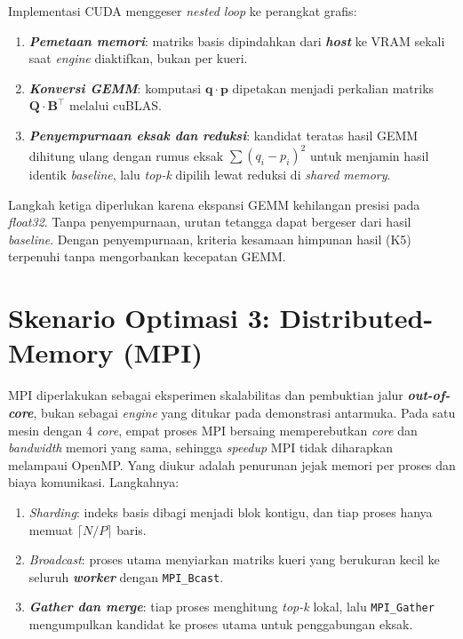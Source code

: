 \documentclass[12pt,a4paper,oneside]{report}
\newcommand{\keyword}[1]{\textbf{\textit{#1}}}
\newcommand{\vect}[1]{\mathbf{#1}}
\begin{document}
Implementasi CUDA menggeser \textit{nested loop} ke perangkat grafis:
\begin{enumerate}[leftmargin=2em]
  \item \keyword{Pemetaan memori}: matriks basis dipindahkan dari \keyword{host} ke VRAM sekali saat \textit{engine} diaktifkan, bukan per kueri.
  \item \keyword{Konversi GEMM}: komputasi $\vect{q} \cdot \vect{p}$ dipetakan menjadi perkalian matriks $\mathbf{Q} \cdot \mathbf{B}^{\top}$ melalui cuBLAS.
  \item \keyword{Penyempurnaan eksak dan reduksi}: kandidat teratas hasil GEMM dihitung ulang dengan rumus eksak $\sum (q_i - p_i)^2$ untuk menjamin hasil identik \textit{baseline}, lalu \textit{top-k} dipilih lewat reduksi di \textit{shared memory}.
\end{enumerate}

Langkah ketiga diperlukan karena ekspansi GEMM kehilangan presisi pada \textit{float32}. Tanpa penyempurnaan, urutan tetangga dapat bergeser dari hasil \textit{baseline}. Dengan penyempurnaan, kriteria kesamaan himpunan hasil (K5) terpenuhi tanpa mengorbankan kecepatan GEMM.

\section{Skenario Optimasi 3: Distributed-Memory (MPI)}

MPI diperlakukan sebagai eksperimen skalabilitas dan pembuktian jalur \keyword{out-of-core}, bukan sebagai \textit{engine} yang ditukar pada demonstrasi antarmuka. Pada satu mesin dengan 4 \textit{core}, empat proses MPI bersaing memperebutkan \textit{core} dan \textit{bandwidth} memori yang sama, sehingga \textit{speedup} MPI tidak diharapkan melampaui OpenMP. Yang diukur adalah penurunan jejak memori per proses dan biaya komunikasi. Langkahnya:
\begin{enumerate}[leftmargin=2em]
  \item \textit{Sharding}: indeks basis dibagi menjadi blok kontigu, dan tiap proses hanya memuat $\lceil N/P \rceil$ baris.
  \item \textit{Broadcast}: proses utama menyiarkan matriks kueri yang berukuran kecil ke seluruh \keyword{worker} dengan \texttt{MPI\_Bcast}.
  \item \keyword{Gather dan merge}: tiap proses menghitung \textit{top-k} lokal, lalu \texttt{MPI\_Gather} mengumpulkan kandidat ke proses utama untuk penggabungan eksak.

\end{enumerate}
\end{document}
